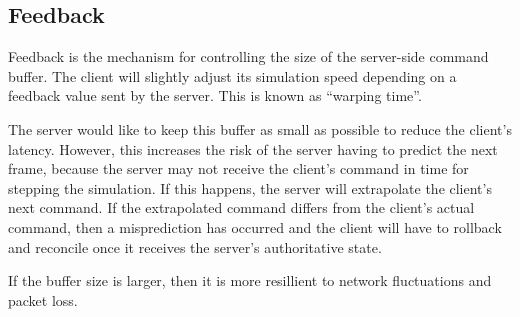 \subsection{Feedback}

Feedback is the mechanism for controlling  the size of the server-side command
buffer. The  client  will  slightly adjust its simulation speed depending on a
feedback value sent  by  the  server.  This  is  known  as  ``warping  time''.

\begin{center}

\end{center}

The server would like to keep this buffer  as  small as possible to reduce the
client's latency. However, this increases the risk  of  the  server  having to
predict  the  next frame, because the server  may  not  receive  the  client's
command in time for stepping the simulation. If  this happens, the server will
extrapolate the  client's  next  command.  If the extrapolated command differs
from  the client's actual command, then a misprediction has occurred  and  the
client  will have to rollback and reconcile  once  it  receives  the  server's
authoritative state.

If  the  buffer  size  is  larger,  then  it  is  more  resillient  to network
fluctuations and packet loss.

\vspace{1.5em}

\begin{figure}[h]

\end{figure}

